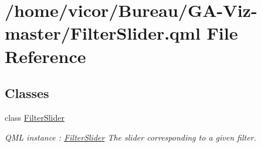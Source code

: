 \hypertarget{_filter_slider_8qml}{}\section{/home/vicor/\+Bureau/\+G\+A-\/\+Viz-\/master/\+Filter\+Slider.qml File Reference}
\label{_filter_slider_8qml}
\subsection*{Classes}
\begin{DoxyCompactItemize}
\item 
class \hyperlink{class_filter_slider}{Filter\+Slider}
\begin{DoxyCompactList}\small\item\em Q\+ML instance \+: \hyperlink{class_filter_slider}{Filter\+Slider} The slider corresponding to a given filter. \end{DoxyCompactList}\end{DoxyCompactItemize}
